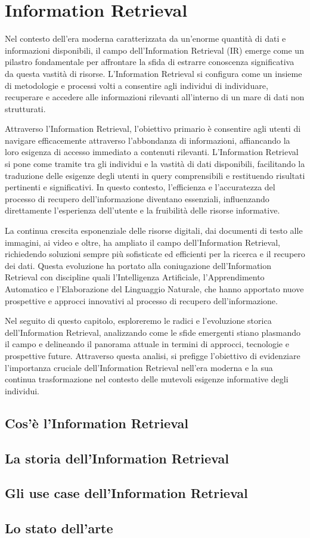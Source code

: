 \chapter{Information Retrieval}\label{Information_Retrieval}
Nel contesto dell'era moderna caratterizzata da un'enorme quantità di dati e informazioni disponibili, il campo dell'Information Retrieval (IR) emerge come un pilastro fondamentale per affrontare la sfida di estrarre conoscenza significativa da questa vastità di risorse. L'Information Retrieval si configura come un insieme di metodologie e processi volti a consentire agli individui di individuare, recuperare e accedere alle informazioni rilevanti all'interno di un mare di dati non strutturati.

Attraverso l'Information Retrieval, l'obiettivo primario è consentire agli utenti di navigare efficacemente attraverso l'abbondanza di informazioni, affiancando la loro esigenza di accesso immediato a contenuti rilevanti. L'Information Retrieval si pone come tramite tra gli individui e la vastità di dati disponibili, facilitando la traduzione delle esigenze degli utenti in query comprensibili e restituendo risultati pertinenti e significativi. In questo contesto, l'efficienza e l'accuratezza del processo di recupero dell'informazione diventano essenziali, influenzando direttamente l'esperienza dell'utente e la fruibilità delle risorse informative.

La continua crescita esponenziale delle risorse digitali, dai documenti di testo alle immagini, ai video e oltre, ha ampliato il campo dell'Information Retrieval, richiedendo soluzioni sempre più sofisticate ed efficienti per la ricerca e il recupero dei dati. Questa evoluzione ha portato alla coniugazione dell'Information Retrieval con discipline quali l'Intelligenza Artificiale, l'Apprendimento Automatico e l'Elaborazione del Linguaggio Naturale, che hanno apportato nuove prospettive e approcci innovativi al processo di recupero dell'informazione.

Nel seguito di questo capitolo, esploreremo le radici e l'evoluzione storica dell'Information Retrieval, analizzando come le sfide emergenti stiano plasmando il campo e delineando il panorama attuale in termini di approcci, tecnologie e prospettive future. Attraverso questa analisi, si prefigge l'obiettivo di evidenziare l'importanza cruciale dell'Information Retrieval nell'era moderna e la sua continua trasformazione nel contesto delle mutevoli esigenze informative degli individui.
\section{Cos'è l'Information Retrieval}

\section{La storia dell'Information Retrieval}
 
\section{Gli use case dell'Information Retrieval}

\section{Lo stato dell'arte}
